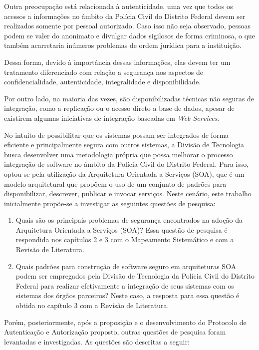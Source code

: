 Outra preocupação está relacionada à autenticidade, uma vez que todos os acessos a informações no âmbito da Polícia Civil do Distrito Federal devem ser realizados somente por pessoal autorizado. Caso isso não seja observado, pessoas podem se valer do anonimato e divulgar dados sigilosos de forma criminosa, o que também acarretaria inúmeros problemas de ordem jurídica para a instituição.

Dessa forma, devido à importância dessas informações, elas devem ter um tratamento diferenciado com relação a segurança nos aspectos de confidencialidade, autenticidade, integralidade e disponibilidade.

Por outro lado, na maioria das vezes, são disponibilizadas técnicas não seguras de integração, como a replicação ou o acesso direto a base de dados, apesar de existirem algumas iniciativas de integração baseadas em \emph{Web Services}.

No intuito de possibilitar que os sistemas possam ser integrados de forma eficiente e principalmente segura com outros sistemas, a Divisão de Tecnologia busca desenvolver uma metodologia própria que possa melhorar o processo integração de software no âmbito da Polícia Civil do Distrito Federal.
Para isso, optou-se pela utilização da Arquitetura Orientada a Serviços (SOA), que é um modelo arquitetural que propõem o uso de um conjunto de padrões para disponibilizar, descrever, publicar e invocar serviços. Neste cenário, este trabalho inicialmente propõe-se a investigar as seguintes questões de pesquisa:

\begin{enumerate}
	\item Quais são os principais problemas de segurança encontrados na adoção da Arquitetura Orientada a Serviços \-(SOA)? Essa questão de pesquisa é respondida nos capítulos 2 e 3 com o Mapeamento Sistemático e com a Revisão de Literatura.
	\item Quais padrões para construção de software seguro em arquiteturas SOA podem ser empregados pela Divisão de Tecnologia da Polícia Civil do Distrito Federal para realizar efetivamente a integração de seus sistemas com os sistemas dos órgãos parceiros? Neste caso, a resposta para essa questão é obtida no capítulo 3 com a Revisão de Literatura.
\end{enumerate}

Porém, posteriormente, após a proposição e o desenvolvimento do Protocolo de Autenticação e Autorização proposto, outras questões de pesquisa foram levantadas e investigadas. As questões são descritas a seguir:

